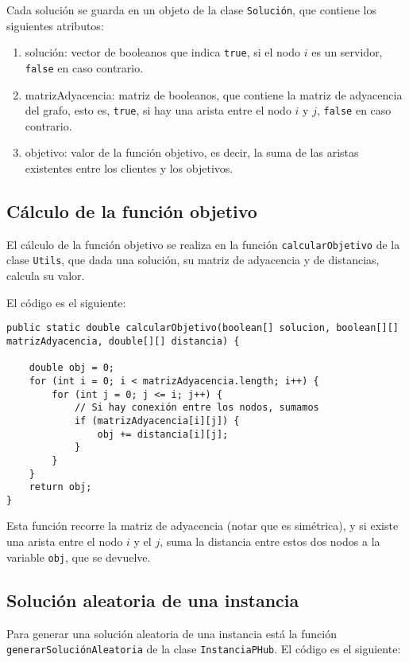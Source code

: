 \documentclass[11pt,a4paper,twoside,openright,titlepage,final]{article}
\begin{document}
Cada solución se guarda en un objeto de la clase \texttt{Solución}, que contiene los siguientes atributos:

\begin{enumerate}
	\item solución: vector de booleanos que indica \texttt{true}, si el nodo $i$ es un servidor, \texttt{false} en caso contrario.
	\item matrizAdyacencia: matriz de booleanos, que contiene la matriz de adyacencia del grafo, esto es, \texttt{true}, si hay una arista entre el nodo $i$ y $j$, \texttt{false} en caso contrario.
	\item objetivo: valor de la función objetivo, es decir, la suma de las aristas existentes entre los clientes y los objetivos. 
\end{enumerate}

\subsection{Cálculo de la función objetivo}

El cálculo de la función objetivo se realiza en la función \texttt{calcularObjetivo} de la clase \texttt{Utils}, que dada una solución, su matriz de adyacencia y de distancias, calcula su valor.

El código es el siguiente:

\begin{verbatim}
public static double calcularObjetivo(boolean[] solucion, boolean[][] matrizAdyacencia, double[][] distancia) {

    double obj = 0;
    for (int i = 0; i < matrizAdyacencia.length; i++) {
        for (int j = 0; j <= i; j++) {
            // Si hay conexión entre los nodos, sumamos
            if (matrizAdyacencia[i][j]) {
                obj += distancia[i][j];
            }
        }
    }
    return obj;
}
\end{verbatim}

Esta función recorre la matriz de adyacencia (notar que es simétrica), y si existe una arista entre el nodo $i$ y el $j$, suma la distancia entre estos dos nodos a la variable \texttt{obj}, que se devuelve.

\subsection{Solución aleatoria de una instancia}

Para generar una solución aleatoria de una instancia está la función \texttt{generarSoluciónAleatoria} de la clase \texttt{InstanciaPHub}. El código es el siguiente:
\end{document}
